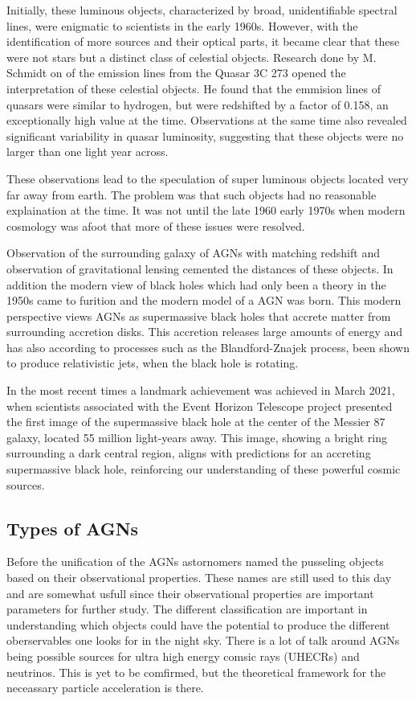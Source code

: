 \documentclass[11pt]{article}
\begin{document}
Initially, these luminous objects, characterized by broad, 
unidentifiable spectral lines, were enigmatic to scientists in the early 1960s. 
However, with the identification of more sources and their optical parts, 
it became clear that these were not stars but a distinct class of celestial objects. 
Research done by M. Schmidt on of the emission lines from 
the Quasar 3C 273 opened the interpretation of these celestial objects. 
He found that the emmision lines of quasars were similar to hydrogen, but were redshifted by a factor of 0.158,
an exceptionally high value at the time. Observations at the same time also revealed significant 
variability in quasar luminosity, suggesting that these objects were no larger than one light year across. 

These observations lead to the speculation of super luminous objects located very far away from earth. The problem was that such objects
had no reasonable explaination at the time. It was not until the late 1960 early 1970s when modern cosmology was 
afoot that more of these issues were resolved.

Observation of the surrounding galaxy of AGNs with matching redshift and observation of gravitational lensing cemented 
the distances of these objects. In addition the modern view of black holes which had only been a theory in the 1950s came to
furition and the modern model of a AGN was born. This modern perspective views AGNs as supermassive black holes that
accrete matter from surrounding accretion disks. This accretion releases large amounts of energy and has also according to 
processes such as  the Blandford-Znajek process, been shown to produce relativistic jets, when the black hole is rotating.

In the most recent times a landmark achievement was achieved in March 2021, when scientists associated with the Event Horizon Telescope project 
presented the first image of the supermassive black hole at the center of the Messier 87 galaxy, located 55 million light-years away.
This image, showing a bright ring surrounding a dark central region, aligns with predictions for an accreting supermassive black hole, 
reinforcing our understanding of these powerful cosmic sources.





\subsection{Types of AGNs}
Before the unification of the AGNs astornomers named the pusseling objects based on their observational properties. These 
names are still used to this day and are somewhat usfull since their observational properties are important parameters for further study. 
The different classification are important in understanding which objects could have the potential to produce the different oberservables one 
looks for in the night sky. There is a lot of talk around AGNs being possible sources for ultra high energy comsic rays (UHECRs) and neutrinos.
This is yet to be comfirmed, but the theoretical framework for the neceassary particle acceleration is there.
\end{document}
